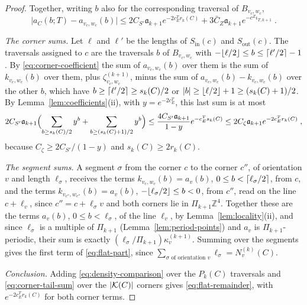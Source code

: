 \documentclass[11pt]{preprint}
\DeclarePairedDelimiter{\abs}{\lvert}{\rvert}
\DeclarePairedDelimiter{\floor}{\lfloor}{\rfloor}
\DeclarePairedDelimiter{\ceil}{\lceil}{\rceil}
\numberwithin{equation}{section}
\theoremstyle{definition}
\theoremstyle{remark}
\theoremstyle{plain}
\begin{document}
\begin{proof}
Together, writing $b$ also for the corresponding traversal of $B_{v_c,w_c}$,
\begin{equation}\label{eq:density-comparison}
    \bigl\lvert a_C(b; T) - a_{v_c,w_c}(b)\bigr\rvert \leq 2C_{S'}\mathfrak a_{k+1}e^{-2c^T_Er_k(C)} + 3\bar C_Z\mathfrak a_{k+1}e^{-c^Z\iota_{T,k+1}}\;.
\end{equation}

\emph{The corner sums.} Let $\ell$ and $\ell'$ be the lengths of $S_{\mathrm{in}}(c)$ and $S_{\mathrm{out}}(c)$. The traversals assigned to $c$ are the traversals $b$ of $B_{v_c,w_c}$ with $-\floor{\ell/2} \leq b \leq \ceil{\ell'/2} - 1$. By \eqref{eq:corner-coefficient} the sum of $a_{v_c,w_c}(b)$ over them is the sum of $k_{v_c,w_c}(b)$ over them, plus $\zeta^{(k+1)}_{v_c,w_c}$, minus the sum of $a_{v_c,w_c}(b) - k_{v_c,w_c}(b)$ over the other $b$, which have $b \geq \ceil{\ell'/2} \geq s_k(C)/2$ or $\abs{b} \geq \floor{\ell/2} + 1 \geq (s_k(C) + 1)/2$. By Lemma~\ref{lem:coefficients}(ii), with $y = e^{-2c^T_E}$, this last sum is at most
\begin{equation}\label{eq:corner-tail-sum}
    2C_{S'}\mathfrak a_{k+1}\Bigl(\sum_{b \geq s_k(C)/2}y^b + \sum_{b \geq (s_k(C)+1)/2}y^b\Bigr) \leq \frac{4C_{S'}\mathfrak a_{k+1}}{1 - y}e^{-c^T_Es_k(C)} \leq 2C_\zeta\mathfrak a_{k+1}e^{-2c^T_Er_k(C)}\;,
\end{equation}
because $C_\zeta \geq 2C_{S'}/(1 - y)$ and $s_k(C) \geq 2r_k(C)$.

\emph{The segment sums.} A segment $\sigma$ from the corner $c$ to the corner $c''$, of orientation $v$ and length $\ell_\sigma$, receives the terms $k_{v_c,w_c}(b) = a_v(b)$, $0 \leq b < \ceil{\ell_\sigma/2}$, from $c$, and the terms $k_{v_{c''},w_{c''}}(b) = a_v(b)$, $-\floor{\ell_\sigma/2} \leq b < 0$, from $c''$, read on the line $c + \ell_v$, since $c'' = c + \ell_\sigma v$ and both corners lie in $\Pi_{k+1}\mathbb Z^4$. Together these are the terms $a_v(b)$, $0 \leq b < \ell_\sigma$, of the line $\ell_v$, by Lemma~\ref{lem:locality}(ii), and since $\ell_\sigma$ is a multiple of $\Pi_{k+1}$ (Lemma~\ref{lem:period-points}) and $a_v$ is $\Pi_{k+1}$-periodic, their sum is exactly $(\ell_\sigma/\Pi_{k+1})\kappa^{(k+1)}_v$. Summing over the segments gives the first term of \eqref{eq:flat-part}, since $\sum_{\sigma \text{ of orientation } v}\ell_\sigma = N^{(k)}_v(C)$.

\emph{Conclusion.} Adding \eqref{eq:density-comparison} over the $P_k(C)$ traversals and \eqref{eq:corner-tail-sum} over the $\abs{\mathcal K(C)}$ corners gives \eqref{eq:flat-remainder}, with $e^{-2c^T_Er_k(C)}$ for both corner terms.
\end{proof}
\end{document}
